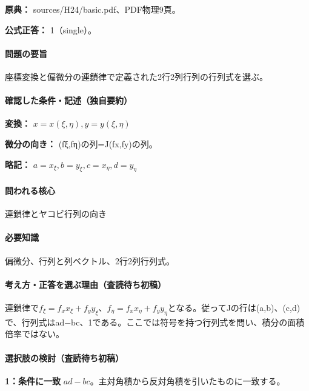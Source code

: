 \noindent\textbf{原典：} sources/H24/basic.pdf、PDF物理9頁。

\textbf{公式正答：} 1（single）。

\paragraph{問題の要旨} 座標変換と偏微分の連鎖律で定義された2行2列行列の行列式を選ぶ。

\paragraph{確認した条件・記述（独自要約）}\mbox{}\par

\noindent\textbf{変換：} \(x=x(\xi,\eta),y=y(\xi,\eta)\)\par

\noindent\textbf{微分の向き：} (fξ,fη)の列=J(fx,fy)の列。\par

\noindent\textbf{略記：} \(a=x_\xi,b=y_\xi,c=x_\eta,d=y_\eta\)\par

\paragraph{問われる核心} 連鎖律とヤコビ行列の向き

\paragraph{必要知識} 偏微分、行列と列ベクトル、2行2列行列式。

\paragraph{考え方・正答を選ぶ理由（査読待ち初稿）} 連鎖律で\(f_\xi=f_xx_\xi+f_yy_\xi\)、\(f_\eta=f_xx_\eta+f_yy_\eta\)となる。従ってJの行は(a,b)、(c,d)で、行列式はad−bc、1である。ここでは符号を持つ行列式を問い、積分の面積倍率ではない。

\paragraph{選択肢の検討（査読待ち初稿）}\mbox{}\par

\noindent\textbf{1：条件に一致} \(ad-bc\)。主対角積から反対角積を引いたものに一致する。\par

